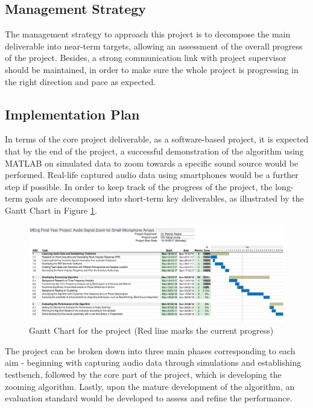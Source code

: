 \documentclass[a4paper,twoside,12pt,hidelinks]{article}
\begin{document}
\subsection{Management Strategy}
The management strategy to approach this project is to decompose the main deliverable into near-term targets, allowing an assessment of the overall progress of the project. Besides, a strong communication link with project supervisor should be maintained, in order to make sure the whole project is progressing in the right direction and pace as expected.

\subsection{Implementation Plan}
In terms of the core project deliverable, as a software-based project, it is expected that by the end of the project, a successful demonstration of the algorithm using MATLAB on simulated data to zoom towards a specific sound source would be performed. Real-life captured audio data using smartphones would be a further step if possible. In order to keep track of the progress of the project, the long-term goals are decomposed into short-term key deliverables, as illustrated by the Gantt Chart in Figure \ref{fig:gantt1}. 

\begin{figure}[H]
\begin{center}
\includegraphics[width=\linewidth,frame]{gantt2}
\end{center}
\caption{Gantt Chart for the project (Red line marks the current progress)}
\label{fig:gantt1}
\end{figure}

The project can be broken down into three main phases corresponding to each aim - beginning with capturing audio data through simulations and establishing testbench, followed by the core part of the project, which is developing the zooming algorithm. Lastly, upon the mature development of the algorithm, an evaluation standard would be developed to assess and refine the performance.
\end{document}
